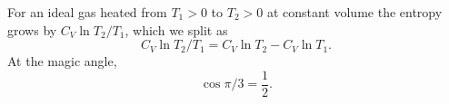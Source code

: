 \documentclass{article}
\begin{document}
For an ideal gas heated from $T_1 > 0$ to $T_2 > 0$ at constant volume the entropy grows by
$C_V\ln T_2/T_1$, which we split as
\begin{equation}
C_V \ln T_2/T_1 = C_V\ln T_2 - C_V\ln T_1 .
\label{eq:s}
\end{equation}
At the magic angle,
\begin{equation}
\cos\pi/3 = \frac{1}{2} .
\label{eq:c}
\end{equation}
\end{document}
